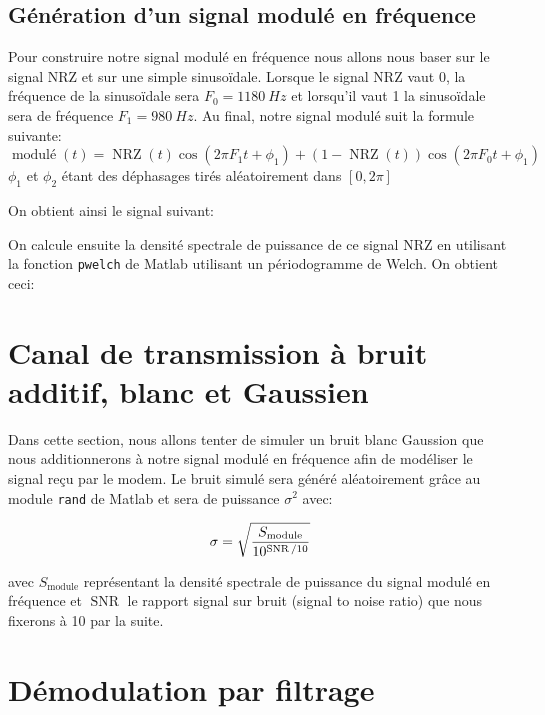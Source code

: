 \documentclass{article}
\begin{document}
\subsection{Génération d'un signal modulé en fréquence}

Pour construire notre signal modulé en fréquence nous allons nous baser sur le signal NRZ et sur une simple sinusoïdale. Lorsque le signal NRZ vaut 0, la fréquence de la sinusoïdale sera $F_0=\SI{1180}{Hz}$ et lorsqu'il vaut 1 la sinusoïdale sera de fréquence $F_1=\SI{980}{Hz}$. Au final, notre signal modulé suit la formule suivante:
\[
\operatorname{modulé}(t)=\operatorname{NRZ}(t) \cos(2\pi F_1 t + \phi_1) + (1-\operatorname{NRZ}(t)) \cos(2 \pi F_0 t + \phi_1)
\]
$\phi_1$ et $\phi_2$ étant des déphasages tirés aléatoirement dans $[0, 2\pi]$



On obtient ainsi le signal suivant:


On calcule ensuite la densité spectrale de puissance de ce signal NRZ en utilisant la fonction \verb|pwelch| de Matlab utilisant un périodogramme de Welch. 
On obtient ceci:



\section{Canal de transmission à bruit additif, blanc et Gaussien}

Dans cette section, nous allons tenter de simuler un bruit blanc Gaussion que nous additionnerons à notre signal modulé en fréquence afin de modéliser le signal reçu par le modem.
Le bruit simulé sera généré aléatoirement grâce au module \verb|rand| de Matlab et sera de puissance $\sigma^2$ avec:

\[
\sigma=\sqrt{\frac{S_\text{module}}{10^{\operatorname{SNR}/10}}} \huge
\]

avec $S_\text{module}$ représentant la densité spectrale de puissance du signal modulé en fréquence et $\operatorname{SNR}$ le rapport signal sur bruit (signal to noise ratio) que nous fixerons à 10 par la suite.


\section{Démodulation par filtrage}
\end{document}
